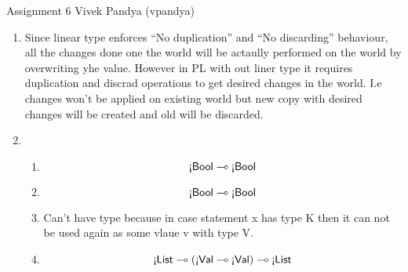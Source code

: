\documentclass[11pt]{article}
\newcommand{\ltyprim}[1]{\text{\textexclamdown}\msf{#1}}
\newcommand{\ltyfun}[2]{{#1} \multimap {#2}}
\begin{document}
\hwtitle
  {Assignment 6}
  {Vivek Pandya (vpandya)} %


\begin{enumerate}
\item %
Since linear type enforces ``No duplication'' and ``No discarding'' behaviour, all the changes done one the world will be actaully performed on the world by overwriting yhe value. However in PL with out liner type it requires duplication and discrad operations to get desired changes in the world. I.e changes won't be applied on existing world but new copy with desired changes will be created and old will be discarded.
\item
  \begin{enumerate} %
    \item $${\ltyfun{\ltyprim{Bool}}{\ltyprim{Bool}}}$$
    \item $${\ltyfun{\ltyprim{Bool}}{\ltyprim{Bool}}}$$
    \item Can't have type because in case statement x has type K then it can not be used again as some vlaue v with type V. 
    \item $${\ltyfun{\ltyfun{\ltyprim{List}}{(\ltyfun{\ltyprim{Val}}{\ltyprim{Val}})}}{\ltyprim{List}}}$$
  \end{enumerate}
\end{enumerate}

\begin{align*}

\end{align*}
\end{document}
